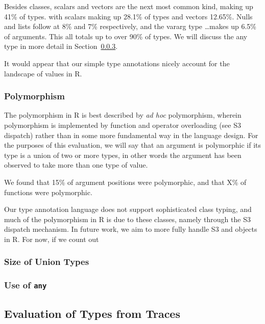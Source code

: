 \documentclass[acmsmall,review,anonymous]{acmart}\settopmatter{printfolios=true,printccs=false,printacmref=false}
\newcommand{\code}[1]{{\lstinline[style=Rin]!#1!}\xspace}
\begin{document}
Besides classes, scalars and vectors are the next most common kind, making up 41\% of types. with scalars making up 28.1\% of types and vectors 12.65\%.
Nulls and lists follow at 8\% and 7\% respectively, and the vararg type \ldots makes up 6.5\% of arguments.
This all totals up to over 90\% of types.
We will discuss the any type in more detail in Section~\ref{subsec:any}.

It would appear that our simple type annotations nicely account for the landscape of values in R.

%
%
\subsubsection{Polymorphism}

The polymorphism in R is best described by {\it ad hoc} polymorphism, wherein polymorphism is implemented by function and operator overloading (see S3 dispatch) rather than in some more fundamental way in the language design.
For the purposes of this evaluation, we will say that an argument is polymorphic if its type is a union of two or more types, in other words the argument has been observed to take more than one type of value.

We found that 15\% of argument positions were polymorphic, and that X\% of functions were polymorphic.

Our type annotation language does not support sophisticated class typing, and much of the polymorphism in R is due to these classes, namely through the S3 dispatch mechanism. 
In future work, we aim to more fully handle S3 and objects in R.
For now, if we count out 

%
%
\subsubsection{Size of Union Types}

%
%
\subsubsection{Use of \code{any}}
\label{subsec:any}

%
%
%
%
\subsection{Evaluation of Types from Traces}
\label{subsec:eval}
\end{document}
